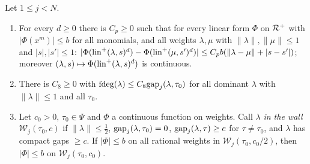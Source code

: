 \begin{lemma}\label{pf:volthm:lem:weights}
Let $1\le j<N$.
\begin{enumerate}[label=(\alph*)]
\item For every $d\ge0$ there is $C_p\ge0$ such that for every linear form $\Phi$ on $\mathcal{R}^+$ with
  $|\Phi(x^m)|\le b$ for all monomials, and all weights $\lambda,\mu$ with $\|\lambda\|,\|\mu\|\le1$ and
  $|s|,|s'|\le1$: $|\Phi(\mathrm{lin}^+(\lambda,s)^d)-\Phi(\mathrm{lin}^+(\mu,s')^d)|\le C_pb(\|\lambda-\mu\|+|s-s'|)$;
  moreover $(\lambda,s)\mapsto\Phi(\mathrm{lin}^+(\lambda,s)^d)$ is continuous.
\item There is $C_8\ge0$ with $\mathrm{fdeg}(\lambda)\le C_8\mathrm{gap}_j(\lambda,\tau_0)$ for all dominant $\lambda$ with
  $\|\lambda\|\le1$ and all $\tau_0$.
\item Let $c_0>0$, $\tau_0\in\Psi$ and $\Phi$ a continuous function on weights. Call $\lambda$ \emph{in the
  wall} $\mathcal W_j(\tau_0,c)$ if $\|\lambda\|\le\frac12$, $\mathrm{gap}_j(\lambda,\tau_0)=0$,
  $\mathrm{gap}_j(\lambda,\tau)\ge c$ for $\tau\ne\tau_0$, and $\lambda$ has compact gaps $\ge c$.
  If $|\Phi|\le b$ on all rational weights in $\mathcal W_j(\tau_0,c_0/2)$, then $|\Phi|\le b$ on
  $\mathcal W_j(\tau_0,c_0)$.
\end{enumerate}
\end{lemma}

